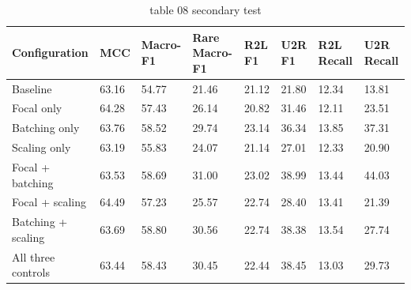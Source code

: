 \begin{table}[t]
\centering
\caption{table 08 secondary test}
\label{tab:secondary_test}
\begin{tabular}{llllllll}
\hline
Configuration & MCC & Macro-F1 & Rare Macro-F1 & R2L F1 & U2R F1 & R2L Recall & U2R Recall \\
\hline
Baseline & 63.16 & 54.77 & 21.46 & 21.12 & 21.80 & 12.34 & 13.81 \\
Focal only & 64.28 & 57.43 & 26.14 & 20.82 & 31.46 & 12.11 & 23.51 \\
Batching only & 63.76 & 58.52 & 29.74 & 23.14 & 36.34 & 13.85 & 37.31 \\
Scaling only & 63.19 & 55.83 & 24.07 & 21.14 & 27.01 & 12.33 & 20.90 \\
Focal + batching & 63.53 & 58.69 & 31.00 & 23.02 & 38.99 & 13.44 & 44.03 \\
Focal + scaling & 64.49 & 57.23 & 25.57 & 22.74 & 28.40 & 13.41 & 21.39 \\
Batching + scaling & 63.69 & 58.80 & 30.56 & 22.74 & 38.38 & 13.54 & 27.74 \\
All three controls & 63.44 & 58.43 & 30.45 & 22.44 & 38.45 & 13.03 & 29.73 \\
\hline
\end{tabular}
\end{table}
